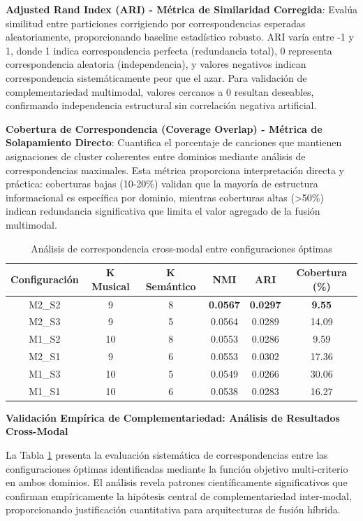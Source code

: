 \documentclass[12pt,a4paper]{report}
\begin{document}
\textbf{Adjusted Rand Index (ARI) - Métrica de Similaridad Corregida}: Evalúa similitud entre particiones corrigiendo por correspondencias esperadas aleatoriamente, proporcionando baseline estadístico robusto. ARI varía entre -1 y 1, donde 1 indica correspondencia perfecta (redundancia total), 0 representa correspondencia aleatoria (independencia), y valores negativos indican correspondencia sistemáticamente peor que el azar. Para validación de complementariedad multimodal, valores cercanos a 0 resultan deseables, confirmando independencia estructural sin correlación negativa artificial.

\textbf{Cobertura de Correspondencia (Coverage Overlap) - Métrica de Solapamiento Directo}: Cuantifica el porcentaje de canciones que mantienen asignaciones de cluster coherentes entre dominios mediante análisis de correspondencias maximales. Esta métrica proporciona interpretación directa y práctica: coberturas bajas (10-20\%) validan que la mayoría de estructura informacional es específica por dominio, mientras coberturas altas (>50\%) indican redundancia significativa que limita el valor agregado de la fusión multimodal.

\begin{table}[h]
\centering
\caption{Análisis de correspondencia cross-modal entre configuraciones óptimas}
\label{tab:crossmodal_analysis}
\begin{tabular}{|c|c|c|c|c|c|}
\hline
\textbf{Configuración} & \textbf{K Musical} & \textbf{K Semántico} & \textbf{NMI} & \textbf{ARI} & \textbf{Cobertura (\%)} \\
\hline
\rowcolor{lightgray}
M2\_S2 & 9 & 8 & \textbf{0.0567} & \textbf{0.0297} & \textbf{9.55} \\
M2\_S3 & 9 & 5 & 0.0564 & 0.0289 & 14.09 \\
M1\_S2 & 10 & 8 & 0.0553 & 0.0286 & 9.59 \\
M2\_S1 & 9 & 6 & 0.0553 & 0.0302 & 17.36 \\
M1\_S3 & 10 & 5 & 0.0549 & 0.0266 & 30.06 \\
M1\_S1 & 10 & 6 & 0.0538 & 0.0283 & 16.27 \\
\hline
\end{tabular}
\end{table}

\textbf{Validación Empírica de Complementariedad: Análisis de Resultados Cross-Modal}

La Tabla \ref{tab:crossmodal_analysis} presenta la evaluación sistemática de correspondencias entre las configuraciones óptimas identificadas mediante la función objetivo multi-criterio en ambos dominios. El análisis revela patrones científicamente significativos que confirman empíricamente la hipótesis central de complementariedad inter-modal, proporcionando justificación cuantitativa para arquitecturas de fusión híbrida.
\end{document}
